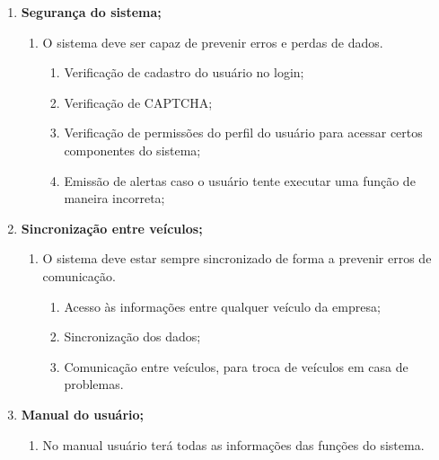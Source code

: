 \begin{enumerate}
      \item \textbf{Segurança do sistema;}

            \begin{enumerate}
                  \item O sistema deve ser capaz de prevenir erros e perdas de dados.
                        \begin{enumerate}
                              \item Verificação de cadastro do usuário no login;
                              \item Verificação de CAPTCHA;
                              \item Verificação de permissões do perfil do usuário para acessar certos componentes do sistema;
                              \item Emissão de alertas caso o usuário tente executar uma função de maneira incorreta;



                        \end{enumerate}
            \end{enumerate}
      \item \textbf{Sincronização entre veículos;}
            \begin{enumerate}

                  \item	O sistema deve estar sempre sincronizado de
                        forma a prevenir erros de comunicação.
                        \begin{enumerate}
                              \item Acesso às informações entre qualquer veículo da empresa;
                              \item Sincronização dos dados;
                              \item Comunicação entre veículos, para troca de veículos em casa de problemas.

                        \end{enumerate}
            \end{enumerate}
      \item \textbf{Manual do usuário;}
            \begin{enumerate}

                  \item	No manual usuário terá todas as informações das funções do
                        sistema.


\end{enumerate}
\end{enumerate}

